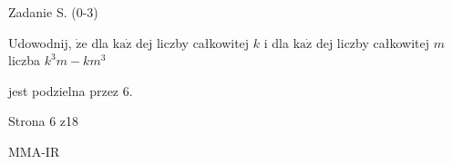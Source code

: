 \documentclass[a4paper,12pt]{article}
\begin{document}
Zadanie S. (0-3)

Udowodnij, $\dot{\mathrm{z}}\mathrm{e}$ dla $\mathrm{k}\mathrm{a}\dot{\mathrm{z}}$ dej liczby całkowitej $k$ i dla $\mathrm{k}\mathrm{a}\dot{\mathrm{z}}$ dej liczby całkowitej $m$ liczba $k^{3}m-km^{3}$

jest podzielna przez 6.

Strona 6 z18

MMA-IR
\end{document}
